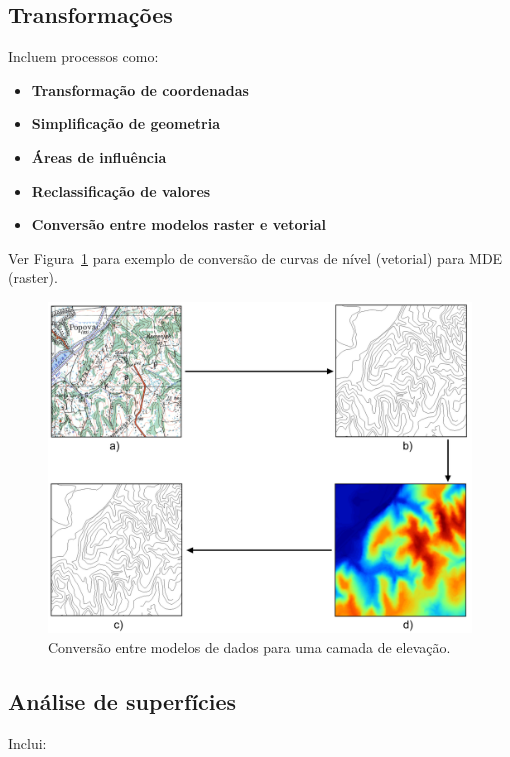 \subsection{Transformações}

Incluem processos como:

\begin{itemize}
 \item \textbf{Transformação de coordenadas}
 \item \textbf{Simplificação de geometria}
 \item \textbf{Áreas de influência}
 \item \textbf{Reclassificação de valores}
 \item \textbf{Conversão entre modelos raster e vetorial}
\end{itemize}

Ver Figura~\ref{Fig:Conversiones} para exemplo de conversão de curvas de nível (vetorial) para MDE (raster).

\begin{figure}[!hbt]   
\centering
\includegraphics[width= \columnwidth]{Analises/Conversiones.png}
\caption{\small Conversão entre modelos de dados para uma camada de elevação.}
\label{Fig:Conversiones} 
\end{figure}

\subsection{Análise de superfícies}

Inclui:


